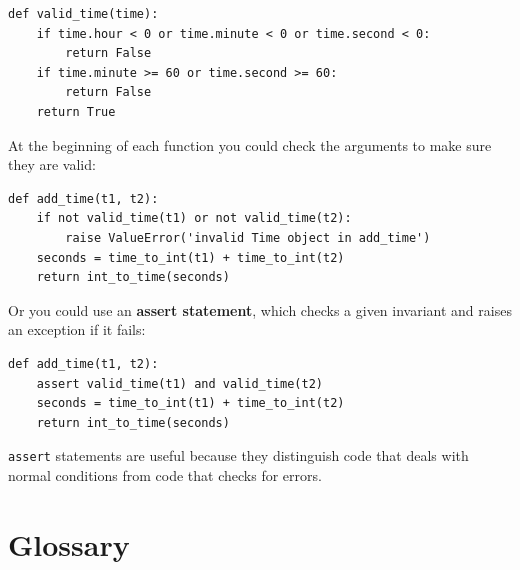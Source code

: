 \documentclass[10pt]{book}
\begin{document}
\begin{verbatim}
def valid_time(time):
    if time.hour < 0 or time.minute < 0 or time.second < 0:
        return False
    if time.minute >= 60 or time.second >= 60:
        return False
    return True
\end{verbatim}
%
At the beginning of each function you could check the
arguments to make sure they are valid:

\begin{verbatim}
def add_time(t1, t2):
    if not valid_time(t1) or not valid_time(t2):
        raise ValueError('invalid Time object in add_time')
    seconds = time_to_int(t1) + time_to_int(t2)
    return int_to_time(seconds)
\end{verbatim}
%
Or you could use an {\bf assert statement}, which checks a given invariant
and raises an exception if it fails:

\begin{verbatim}
def add_time(t1, t2):
    assert valid_time(t1) and valid_time(t2)
    seconds = time_to_int(t1) + time_to_int(t2)
    return int_to_time(seconds)
\end{verbatim}
%
{\tt assert} statements are useful because they distinguish
code that deals with normal conditions from code
that checks for errors.


\section{Glossary}
\end{document}
